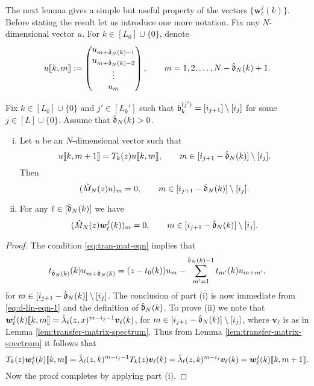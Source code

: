 \documentclass{amsart}
\numberwithin{equation}{section}
\def\corAB{}
\begin{document}
The next lemma
gives a simple but useful property of
the vectors $\{{\bm w}^j_\ell(k)\}$. Before stating the result let us introduce one more notation. Fix any $N$-dimensional vector $u$. For $k \in [L_0]\cup\{0\}$, denote
\[
u\llbracket k, m \rrbracket:= \begin{pmatrix} u_{m+\hat{\mathfrak{d}}_N(k)-1} \\ u_{m+\hat{\mathfrak{d}}_N(k)-2} \\ \vdots \\ u_m \end{pmatrix}, \qquad  m =1,2, \ldots, N-\hat{\mathfrak{d}}_N(k)+1.
\]
\begin{lemma}\label{eq:small-sing-vector}
Fix $k \in [L_0] \cup\{0\}$ and $j' \in [L_k']$ such that $\mathfrak{b}_k^{(j')}=[i_{j+1}]\setminus [i_j]$ for some $j \in [L]\cup\{0\}$. Assume that $\hat{\mathfrak{d}}_N(k) >0$.
\begin{enumerate}[(i)]
\item Let $u$ be an $N$-dimensional vector such that
\begin{equation}\label{eq:tran-mat-eqn}
u\llbracket k, m+1 \rrbracket= T_k(z) u\llbracket k,m \rrbracket, \qquad m \in [i_{j+1}-\hat{\mathfrak{d}}_N(k)]\setminus [i_j].
\end{equation}
Then
\[
(\hat{M}_N(z) u )_m=0, \qquad m\in [i_{j+1}-\hat{\mathfrak{d}}_N(k)]\setminus [i_j].
\]
\item For any $\ell \in[\hat{\mathfrak{d}}_N(k)]$ we have
\[
(\hat{M}_N(z) {\bm w}_\ell^j(k) )_m=0, \qquad m\in [i_{j+1}-\hat{\mathfrak{d}}_N(k)]\setminus [i_j].
\]
\end{enumerate}
\end{lemma}
\begin{proof}
The condition \eqref{eq:tran-mat-eqn} implies that
\[
t_{\corAB{\hat\gd_N(k)}}(k) u_{m+\hat\gd_N(k)}= (z-t_0(k)) u_m - \sum_{m'=1}^{\hat\gd_N(k)-1} t_{m'}(k) u_{m+m'},
\]
for $m \in [i_{j+1}-\hat{\mathfrak{d}}_N(k)]\setminus [i_j]$. The conclusion of part (i) is now immediate from \eqref{eq:d-lin-eqn-1} and the definition of $\corAB{\hat\gd_N(k)}$. To prove (ii) we note that ${\bm w}_\ell^j(k) \llbracket k,m \rrbracket = \hat{\lambda}_\ell(z,x)^{m-i_j-1} {\bm v}_\ell(k)$, for $m \in [i_{j+1}-\hat{\mathfrak{d}}_N(k)]\setminus [i_j]$, where ${\bm v}_\ell$ is as in Lemma \ref{lem:transfer-matrix-spectrum}. Thus from Lemma \ref{lem:transfer-matrix-spectrum} it follows that
$$T_k(z){\bm w}_{\ell}^j(k) \llbracket k,m \rrbracket = \hat{\lambda}_\ell(z,k)^{m-i_j-1} T_k(z) {\bm v}_\ell(k) = \hat{\lambda}_\ell(z,k)^{m-i_j}  {\bm v}_\ell(k) = {\bm w}_\ell^j(k) \llbracket k,m+1 \rrbracket.$$
Now the proof completes by applying part (i).
\end{proof}
\end{document}
